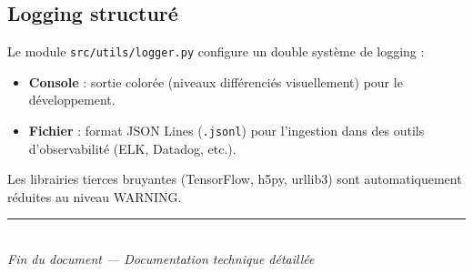 \documentclass[11pt,a4paper]{article}
\begin{document}
\subsection{Logging structuré}

Le module \texttt{src/utils/logger.py} configure un double système de logging :
\begin{itemize}[leftmargin=2em]
  \item \textbf{Console} : sortie colorée (niveaux différenciés visuellement) pour le développement.
  \item \textbf{Fichier} : format JSON Lines (\texttt{.jsonl}) pour l'ingestion dans des outils d'observabilité (ELK, Datadog, etc.).
\end{itemize}

Les librairies tierces bruyantes (TensorFlow, h5py, urllib3) sont automatiquement réduites au niveau WARNING.

\vfill
\begin{center}
\textcolor{accent}{\rule{0.5\textwidth}{0.5pt}}\\[0.5em]
\textit{Fin du document --- Documentation technique détaillée}
\end{center}
\end{document}

